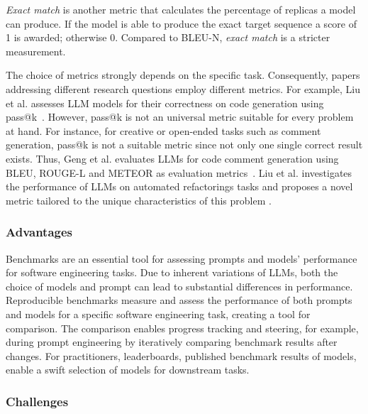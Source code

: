 \emph{Exact match} is another metric that calculates the percentage of replicas a model can produce.
If the model is able to produce the exact target sequence a score of 1 is awarded; otherwise 0.
Compared to BLEU-N, \emph{exact match} is a stricter measurement.

The choice of metrics strongly depends on the specific task.
Consequently, papers addressing different research questions employ different metrics.
For example, Liu et al. assesses LLM models for their correctness on code generation using pass@k~\cite{DBLP:conf/nips/LiuXW023}.
However, pass@k is not an universal metric suitable for every problem at hand.
For instance, for creative or open-ended tasks such as comment generation, pass@k is not a suitable metric since not only one single correct result exists.
Thus, Geng et al. evaluates LLMs for code comment generation using BLEU, ROUGE-L and METEOR as evaluation metrics~\cite{DBLP:conf/icse/GengWD00JML24}.
Liu et al. investigates the performance of LLMs on automated refactorings tasks and proposes a novel metric tailored to the unique characteristics of this problem \cite{DBLP:journals/ase/LiuJZNLL25}.



\subsubsection{Advantages}

Benchmarks are an essential tool for assessing prompts and models' performance for software engineering tasks.
Due to inherent variations of LLMs, both the choice of models and prompt can lead to substantial differences in performance.
Reproducible benchmarks measure and assess the performance of both prompts and models for a specific software engineering task, creating a tool for comparison.
The comparison enables progress tracking and steering, for example, during prompt engineering by iteratively comparing benchmark results after changes.
For practitioners, leaderboards, published benchmark results of models, enable a swift selection of models for downstream tasks.

\subsubsection{Challenges}


